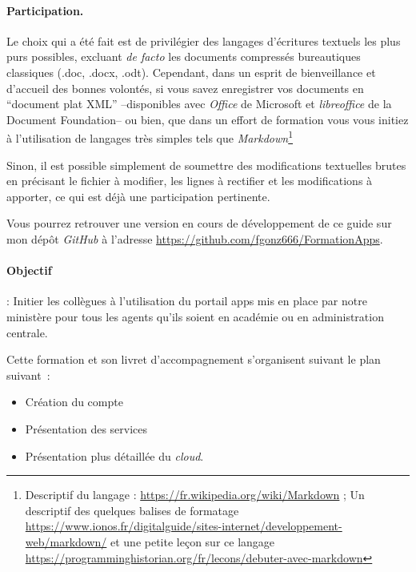 \paragraph{Participation.}
Le choix qui a été fait est de privilégier des langages d'écritures textuels les plus purs possibles, excluant \emph{de facto\/} les documents compressés bureautiques classiques (.doc, .docx, .odt). 
Cependant, dans un esprit de bienveillance et d'accueil des bonnes volontés, si vous savez enregistrer vos documents en ``document plat XML'' --disponibles avec \emph{Office} de Microsoft et \emph{libreoffice} de la Document Foundation-- ou bien, que dans un effort de formation vous vous initiez à l'utilisation de langages très simples tels que \emph{Markdown}\footnote{%
Descriptif du langage : \url{https://fr.wikipedia.org/wiki/Markdown} ; Un descriptif des quelques balises de formatage \url{https://www.ionos.fr/digitalguide/sites-internet/developpement-web/markdown/} et une petite leçon sur ce langage \url{https://programminghistorian.org/fr/lecons/debuter-avec-markdown}
}

Sinon, il est possible simplement de soumettre des modifications textuelles brutes en précisant le fichier à modifier, les lignes à rectifier et les modifications à apporter, ce qui est déjà une participation pertinente.

Vous pourrez retrouver une version en cours de développement de ce guide sur mon dépôt \emph{GitHub} à l'adresse \url{https://github.com/fgonz666/FormationApps}.



\paragraph{Objectif} : Initier les collègues à l'utilisation du portail apps mis en place par notre ministère pour tous les agents qu'ils soient en académie ou en administration centrale. 

\vspace{2cm}

Cette formation et son livret d'accompagnement s'organisent suivant le plan suivant~:
\begin{itemize}
    \item Création du compte
    \item Présentation des services
    \item Présentation plus détaillée du \emph{cloud\/}.
\end{itemize}
